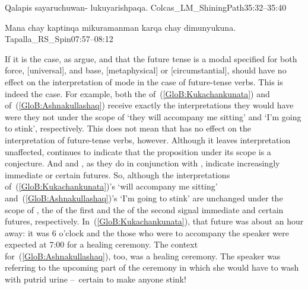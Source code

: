 %
{Qalapis sayaruchuwan- lukuyarishpaqa.}%
{}%
{Colcas\_LM\_ShiningPath}{35:32--35:40}%

%
{Mana chay kaptinqa mikuramanman karqa chay dimunyukuna.}%
{}%
{Tapalla\_RS\_Spin}{07:57--08:12}%

If it is the case, as \citet{Copley09} argue, and \citet{Matthewson05} that the future tense is a modal specified for both force, [universal], and base, [metaphysical] or [circumstantial],  should have no effect on the interpretation of mode in the case of future-tense verbs. This is indeed the case. For example, both the  of~(\ref{GloB:Kukachankunata}) and  of~(\ref{GloB:Ashnakullashaq}) receive exactly the interpretations they would have were they not under the scope of  ‘they will accompany me sitting’ and ‘I’m going to stink’, respectively. This does not mean that  has no effect on the interpretation of future-tense verbs, however. Although it leaves  interpretation unaffected,  continues to indicate that the proposition under its scope is a conjecture. And  and , as they do in conjunction with , indicate increasingly immediate or certain futures. So, although the  interpretations of~(\ref{GloB:Kukachankunata})’s  ‘will accompany me sitting’ and~(\ref{GloB:Ashnakullashaq})’s  ‘I’m going to stink’ are unchanged under the scope of , the  of the first and the  of the second signal immediate and certain futures, respectively. In~(\ref{GloB:Kukachankunata}), that future was about an hour away: it was 6 o’clock and the those who were to accompany the speaker were expected at 7:00 for a healing ceremony. The context for~(\ref{GloB:Ashnakullashaq}), too, was a healing ceremony. The speaker was referring to the upcoming part of the ceremony in which she would have to wash with putrid urine --~certain to make anyone stink!\\

